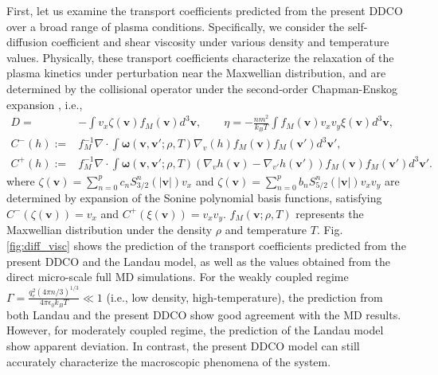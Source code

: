 \documentclass[preprint,1p,times]{elsarticle}
\theoremstyle{definition}
\theoremstyle{remark}
\begin{document}
First, let us examine the transport coefficients predicted from the present DDCO over a broad range of plasma conditions. Specifically, we consider the self-diffusion coefficient and shear viscosity  under various density and temperature values. Physically, these transport coefficients characterize the relaxation of the plasma kinetics under perturbation near the Maxwellian distribution, and are determined by the collisional operator under the second-order Chapman-Enskog expansion \cite{chapman1990mathematical,reichl2009modern}, i.e., 
\begin{equation}
\begin{aligned}
    D =& -\int v_x \zeta (\bm v) f_M(\bm v) d^{3} \bm v, \qquad  \eta = -\frac{nm^2}{k_BT} \int  f_M(\bm v) v_x v_y \xi(\bm v)  d^{3} \bm v, \\
    C^{-}(h) :=& f_M^{-1}  \nabla \cdot \int \bm \omega(\bm v, \bm v'; \rho, T) \nabla_v(h) f_M(\bm v) f_M (\bm v') d^3\bm v' , \\
    C^{+}(h) :=& f_M^{-1}  \nabla \cdot \int \bm \omega(\bm v, \bm v'; \rho, T) (\nabla_v h(\bm v)- \nabla_{v'}h(\bm v')) f_M(\bm v) f_M (\bm v') d^3\bm v'.
\end{aligned}
\end{equation}
where $\zeta(\bm v) = \sum_{n=0}^p c_n S^n_{3/2} (\vert \bm v\vert) v_x$ and $\zeta(\bm v) = \sum_{n=0}^p b_n S^n_{5/2} (\vert \bm v\vert) v_x v_y$ are determined by expansion of the Sonine polynomial basis functions, satisfying $C^{-} (\zeta(\bm v)) = v_x$ and $C^{+} (\xi(\bm v)) = v_x v_y$. $f_M(\bm v; \rho, T)$ represents the Maxwellian distribution under the density $\rho$ and temperature $T$. Fig. \ref{fig:diff_visc} shows the prediction of the transport coefficients predicted from the present DDCO and the Landau model, as well as the values obtained from the direct micro-scale full MD simulations. For the weakly coupled regime $\Gamma = \frac{q_{e}^{2} (4\pi n/3)^{1/3}}{4\pi \epsilon_{0} k_{B} T} \ll 1$ (i.e., low density, high-temperature), the prediction from both Landau and the present DDCO show good agreement with the MD results. However, for moderately coupled regime, the prediction of the Landau model show apparent deviation. In contrast, the present DDCO model can still accurately characterize the macroscopic phenomena of the system.
\end{document}
